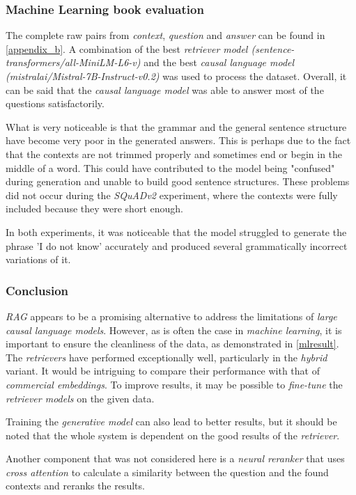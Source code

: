 \documentclass{article}
\begin{document}
\subsubsection*{Machine Learning book evaluation}
The complete raw pairs from \textit{context}, \textit{question} and \textit{answer} can be found in \cref{appendix_b}.
A combination of the best \textit{retriever model (sentence-transformers/all-MiniLM-L6-v)} and the best \textit{causal language model (mistralai/Mistral-7B-Instruct-v0.2)} was used to process the dataset. Overall, it can be said that the \textit{causal language model} was able to answer most of the questions satisfactorily.

What is very noticeable is that the grammar and the general sentence structure have become very poor in the generated answers. This is perhaps due to the fact that the contexts are not trimmed properly and sometimes end or begin in the middle of a word. This could have contributed to the model being "confused" during generation and unable to build good sentence structures. These problems did not occur during the \textit{SQuADv2} experiment, where the contexts were fully included because they were short enough.

In both experiments, it was noticeable that the model struggled to generate the phrase 'I do not know' accurately and produced several grammatically incorrect variations of it.

\newpage
\subsubsection{Conclusion}
\textit{RAG} appears to be a promising alternative to address the limitations of \textit{large causal language models}. However, as is often the case in \textit{machine learning}, it is important to ensure the cleanliness of the data, as demonstrated in \cref{mlresult}. The \textit{retrievers} have performed exceptionally well, particularly in the \textit{hybrid} variant. It would be intriguing to compare their performance with that of \textit{commercial embeddings}. To improve results, it may be possible to \textit{fine-tune} the \textit{retriever models} on the given data.

Training the \textit{generative model} can also lead to better results, but it should be noted that the whole system is dependent on the good results of the \textit{retriever}. 

Another component that was not considered here is a \textit{neural reranker} that uses \textit{cross attention} to calculate a similarity between the question and the found contexts and reranks the results.
\end{document}
